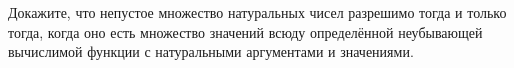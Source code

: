 Докажите, что непустое множество натуральных чисел разрешимо тогда и только тогда, когда оно есть множество значений всюду
определённой неубывающей вычислимой функции с натуральными аргументами и значениями.